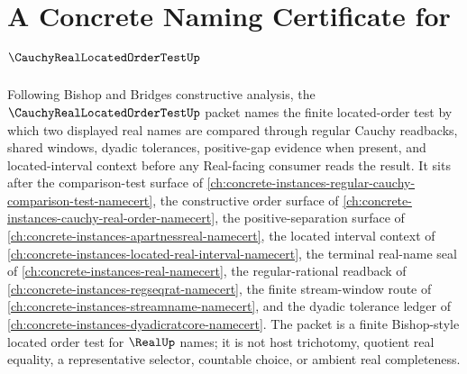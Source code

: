 \chapter{A Concrete Naming Certificate for $\CauchyRealLocatedOrderTestUp$}
\label{ch:concrete-instances-cauchy-real-located-order-test-namecert}

Following Bishop and Bridges constructive analysis, the $\CauchyRealLocatedOrderTestUp$ packet names the finite located-order test by which two displayed real names are compared through regular Cauchy readbacks, shared windows, dyadic tolerances, positive-gap evidence when present, and located-interval context before any Real-facing consumer reads the result. It sits after the comparison-test surface of \autoref{ch:concrete-instances-regular-cauchy-comparison-test-namecert}, the constructive order surface of \autoref{ch:concrete-instances-cauchy-real-order-namecert}, the positive-separation surface of \autoref{ch:concrete-instances-apartnessreal-namecert}, the located interval context of \autoref{ch:concrete-instances-located-real-interval-namecert}, the terminal real-name seal of \autoref{ch:concrete-instances-real-namecert}, the regular-rational readback of \autoref{ch:concrete-instances-regseqrat-namecert}, the finite stream-window route of \autoref{ch:concrete-instances-streamname-namecert}, and the dyadic tolerance ledger of \autoref{ch:concrete-instances-dyadicratcore-namecert}. The packet is a finite Bishop-style located order test for $\RealUp$ names; it is not host trichotomy, quotient real equality, a representative selector, countable choice, or ambient real completeness.

